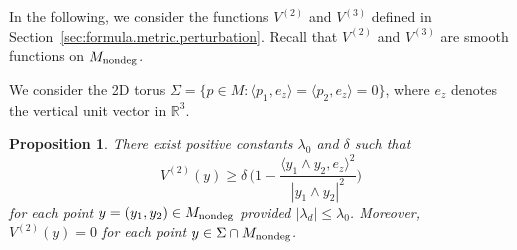 \documentclass[11pt]{amsart}
\newtheorem{proposition}[theorem]{Proposition}
\theoremstyle{definition}
\begin{document}

In the following, we consider the functions $V^{(2)}$ and $V^{(3)}$ defined in Section~\ref{sec:formula.metric.perturbation}. Recall that $V^{(2)}$ and $V^{(3)}$ are smooth functions on $M_{\text{\rm nondeg}}$. 

We consider the 2D torus $\Sigma = \{p \in M: \langle p_1,e_z \rangle = \langle p_2,e_z\rangle = 0\}$, where $e_z$ denotes the vertical unit vector in $\mathbb{R}^3$.

\begin{proposition}
\label{second.order.change.in.sectional.curvature}
There exist positive constants $\lambda_0$ and $\delta$ such that
\[V^{(2)}(y) \geq \delta \, \Big ( 1 - \frac{\langle y_1 \wedge y_2,e_z \rangle^2}{|y_1 \wedge y_2|^2} \Big )\] 
for each point $y = (y_1,y_2) \in M_{\text{\rm nondeg}}$ provided $|\lambda_d|\leq \lambda_0$. Moreover, $V^{(2)}(y) = 0$ for each point $y \in \Sigma \cap M_{\text{\rm nondeg}}$. 
\end{proposition}
\end{document}
